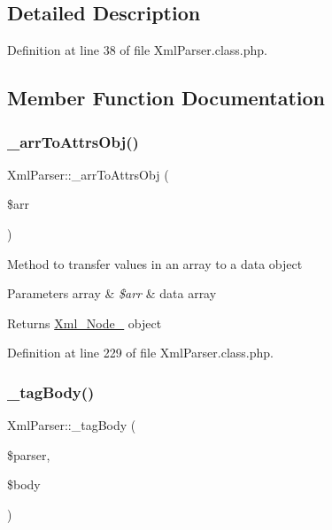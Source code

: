 \subsection{Detailed Description}


Definition at line 38 of file Xml\+Parser.\+class.\+php.



\subsection{Member Function Documentation}
\hypertarget{classXmlParser_ad6c6c76f2e0c9fbd04c071fc30f1a193}{}\label{classXmlParser_ad6c6c76f2e0c9fbd04c071fc30f1a193} 
\subsubsection{\texorpdfstring{\+\_\+arr\+To\+Attrs\+Obj()}{\_arrToAttrsObj()}}
{\footnotesize\ttfamily Xml\+Parser\+::\+\_\+arr\+To\+Attrs\+Obj (\begin{DoxyParamCaption}\item[{}]{\$arr }\end{DoxyParamCaption})}

Method to transfer values in an array to a data object 
\begin{DoxyParams}[1]{Parameters}
array & {\em \$arr} & data array \\
\hline
\end{DoxyParams}
\begin{DoxyReturn}{Returns}
\hyperlink{classXml__Node__}{Xml\+\_\+\+Node\+\_\+} object 
\end{DoxyReturn}


Definition at line 229 of file Xml\+Parser.\+class.\+php.

\hypertarget{classXmlParser_a1205550b688631ab1296365904c61a92}{}\label{classXmlParser_a1205550b688631ab1296365904c61a92} 
\subsubsection{\texorpdfstring{\+\_\+tag\+Body()}{\_tagBody()}}
{\footnotesize\ttfamily Xml\+Parser\+::\+\_\+tag\+Body (\begin{DoxyParamCaption}\item[{}]{\$parser,  }\item[{}]{\$body }\end{DoxyParamCaption})}

